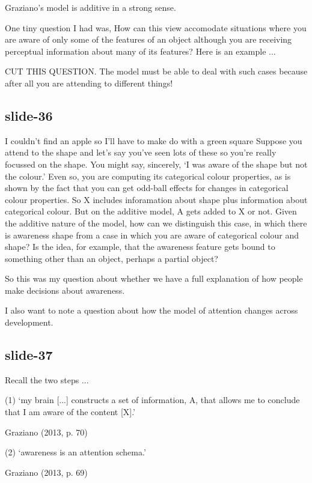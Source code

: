 \documentclass[14pt,\papersize]{extarticle}
\begin{document}
Graziano’s model is additive in a strong sense.
 
One tiny question I had was, How can this view accomodate situations where
you are aware of only some of the features of an object although
you are receiving perceptual information about many of its features?
Here is an example ...
 
CUT THIS QUESTION.  The model must be able to deal with such cases because
after all you are attending to different things!
 
\subsection{slide-36}
I couldn't find an apple so I'll have to make do with a green square
Suppose you attend to the shape and let’s say you’ve seen lots of these
so you’re really focussed on the shape.
You might say, sincerely, ‘I was aware of the shape but not the colour.’
Even so, you are computing its categorical colour properties, as is 
shown by the fact that you can get odd-ball effects for changes in 
categorical colour properties.
So X includes inforamation about shape plus information about categorical 
colour.
But on the additive model, A gets added to X or not.
Given the additive nature of the model,
how can we distinguish this case, in which there is awareness shape 
from a case in which you are aware of categorical colour and shape?
Is the idea, for example, that the awareness feature gets bound to 
something other than an object, perhaps a partial object?
 
So this was my question about whether we have a full explanation of how
people make decisions about awareness.
 
I also want to note a question about how the model of attention 
changes across development.
 
\subsection{slide-37}
Recall the two steps ...
 
(1) ‘my brain [...] constructs a set of information, A, that allows me to 
conclude that I am aware of the content [X].’
            


            
Graziano (2013, p. 70)

 
(2) ‘awareness is an attention schema.’
            


            
Graziano (2013, p. 69)
\end{document}
